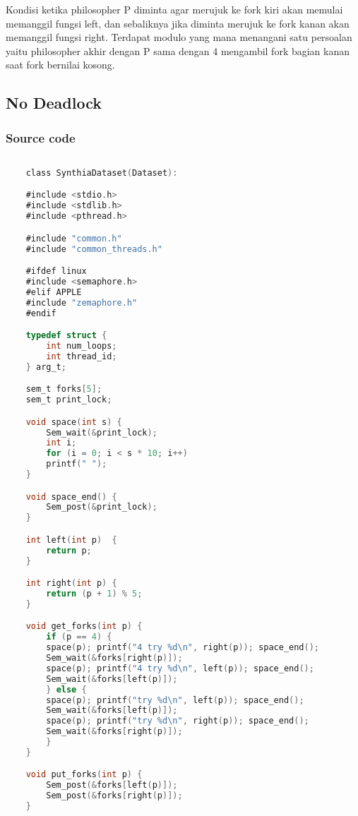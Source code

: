 \documentclass[11pt,a4paper]{article}
\begin{document}
Kondisi ketika philosopher P diminta agar merujuk ke fork kiri akan memulai memanggil fungsi left, dan sebaliknya jika diminta merujuk ke fork kanan akan memanggil fungsi right. Terdapat modulo yang mana menangani satu persoalan yaitu philosopher akhir dengan P sama dengan 4 mengambil fork bagian kanan saat fork bernilai kosong.

\subsection{\textbf{No Deadlock}}
\subsubsection{\textbf{Source code}}
    \begin{lstlisting}[language=C,label={labelkode}]
    
    class SynthiaDataset(Dataset):

    #include <stdio.h>
    #include <stdlib.h>
    #include <pthread.h>

    #include "common.h"
    #include "common_threads.h"

    #ifdef linux
    #include <semaphore.h>
    #elif APPLE
    #include "zemaphore.h"
    #endif

    typedef struct {
        int num_loops;
        int thread_id;
    } arg_t;

    sem_t forks[5];
    sem_t print_lock;

    void space(int s) {
        Sem_wait(&print_lock);
        int i;
        for (i = 0; i < s * 10; i++)
	    printf(" ");
    }

    void space_end() {
        Sem_post(&print_lock);
    }

    int left(int p)  {
        return p;
    }

    int right(int p) {
        return (p + 1) % 5;
    }

    void get_forks(int p) {
        if (p == 4) {
	    space(p); printf("4 try %d\n", right(p)); space_end();
	    Sem_wait(&forks[right(p)]);
	    space(p); printf("4 try %d\n", left(p)); space_end();
	    Sem_wait(&forks[left(p)]);
        } else {
	    space(p); printf("try %d\n", left(p)); space_end();
	    Sem_wait(&forks[left(p)]);
	    space(p); printf("try %d\n", right(p)); space_end();
	    Sem_wait(&forks[right(p)]);
        }
    }

    void put_forks(int p) {
        Sem_post(&forks[left(p)]);
        Sem_post(&forks[right(p)]);
    }


\end{lstlisting}
\end{document}
